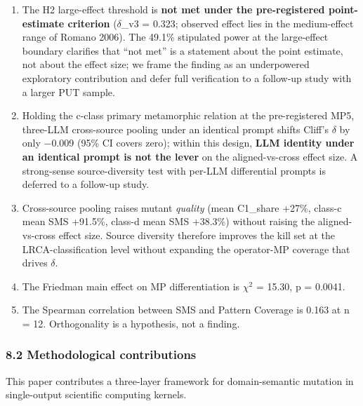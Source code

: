 \documentclass[review,12pt,authoryear]{elsarticle}
\begin{document}
\begin{enumerate}
\def\labelenumi{(\roman{enumi})}
\item
  The H2 large-effect threshold is \textbf{not met under the
  pre-registered point-estimate criterion} ($\delta$\_v3 = 0.323; observed
  effect lies in the medium-effect range of Romano 2006). The 49.1\%
  stipulated power at the large-effect boundary clarifies that ``not
  met'' is a statement about the point estimate, not about the effect
  size; we frame the finding as an underpowered exploratory contribution
  and defer full verification to a follow-up study with a larger PUT
  sample.
\item
  Holding the c-class primary metamorphic relation at the pre-registered
  MP5, three-LLM cross-source pooling under an identical prompt shifts
  Cliff's $\delta$ by only −0.009 (95\% CI covers zero); within this design,
  \textbf{LLM identity under an identical prompt is not the lever} on
  the aligned-vs-cross effect size. A strong-sense source-diversity test
  with per-LLM differential prompts is deferred to a follow-up study.
\item
  Cross-source pooling raises mutant \emph{quality} (mean C1\_share
  +27\%, class-c mean SMS +91.5\%, class-d mean SMS +38.3\%) without
  raising the aligned-vs-cross effect size. Source diversity therefore
  improves the kill set at the LRCA-classification level without
  expanding the operator-MP coverage that drives $\delta$.
\item
  The Friedman main effect on MP differentiation is $\chi$$^{2}$ = 15.30, p =
  0.0041.
\item
  The Spearman correlation between SMS and Pattern Coverage is 0.163 at
  n = 12. Orthogonality is a hypothesis, not a finding.
\end{enumerate}

\subsubsection{8.2 Methodological contributions}\label{methodological-contributions}

This paper contributes a three-layer framework for domain-semantic
mutation in single-output scientific computing kernels.
\end{document}

